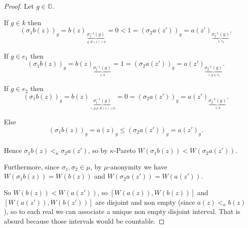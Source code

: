 \documentclass{article}
\begin{document}
\begin{proof}
  Let $g\in\mathbb G$.

  If $g\in k$ then
  \[(\sigma_1 b(z))_g=b(z)_{\underset{\notin E(z)\cup k}
  {\underbrace{\sigma_1^{-1}(g)}}}=0<1=(\sigma_2 a(z'))_g=
  a(z')_{\underset{\in e_2}{\underbrace{\sigma_2^{-1}(g)}}}.\]

  If $g\in e_1$ then
  \[(\sigma_1 b(z))_g=b(z)_{\underset{\in k}{\underbrace{\sigma_1^{-1}(g)}}}=
  1=(\sigma_2 a(z'))_g=a(z')_{\underset{=g\in e_1}
  {\underbrace{\sigma_2^{-1}(g)}}}.\]

  If $g\in e_2$ then
  \[(\sigma_1 b(z))_g=b(z)_{\underset{=g \notin E(z)\cup k}
  {\underbrace{\sigma_1^{-1}(g)}}}=0=(\sigma_2 a(z'))_g=a(z')_{\underset{\in k}
  {\underbrace{\sigma_2^{-1}(g)}}}.\]

  Else
  \[(\sigma_1 b(z))_g=a(z)_g\leq (\sigma_2 a(z'))_g=a(z')_g.\] \\

  Hence $\sigma_1b(z)<_\kappa \sigma_2a(z')$, so by $\kappa$-Pareto
  $W(\sigma_1b(z))<W(\sigma_2a(z'))$.

  Furthermore, since $\sigma_1,\sigma_2\in\mu$, by $\mu$-anonymity we have
  $W(\sigma_1b(z))=W(b(z))$ and $W(\sigma_2a(z'))=W(a(z'))$.

  So $W(b(z))<W(a(z'))$, so $[W(a(z)),W(b(z))]$ and $[W(a(z')),W(b(z'))]$
  are disjoint and non empty (since $a(z)<_\kappa b(z)$), so to each real
  we can associate a unique non empty disjoint interval. That is absurd because
  those intervals would be countable.

\end{proof}





\end{document}
